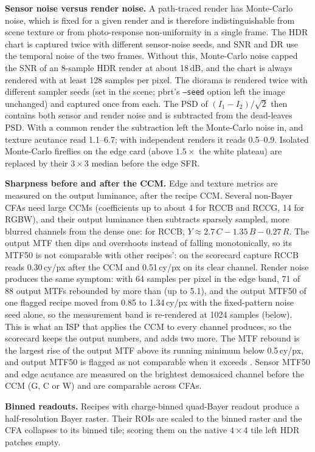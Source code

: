 \documentclass[letterpaper,twocolumn,fleqn]{article}
\begin{document}
\textbf{Sensor noise versus render noise.} A path-traced render has Monte-Carlo noise, which is fixed for a given render and is therefore indistinguishable from scene texture or from photo-response non-uniformity in a single frame. The HDR chart is captured twice with different sensor-noise seeds, and SNR and DR use the temporal noise of the two frames. Without this, Monte-Carlo noise capped the SNR of an 8-sample HDR render at about 18\,dB, and the chart is always rendered with at least 128 samples per pixel. The diorama is rendered twice with different sampler seeds (set in the scene; pbrt's \texttt{--seed} option left the image unchanged) and captured once from each. The PSD of $(I_1-I_2)/\sqrt{2}$ then contains both sensor and render noise and is subtracted from the dead-leaves PSD. With a common render the subtraction left the Monte-Carlo noise in, and texture acutance read 1.1--6.7; with independent renders it reads 0.5--0.9. Isolated Monte-Carlo fireflies on the edge card (above $1.5\times$ the white plateau) are replaced by their $3\times3$ median before the edge SFR.

\textbf{Sharpness before and after the CCM.} Edge and texture metrics are measured on the output luminance, after the recipe CCM. Several non-Bayer CFAs need large CCMs (coefficients up to about 4 for RCCB and RCCG, 14 for RGBW), and their output luminance then subtracts sparsely sampled, more blurred channels from the dense one: for RCCB, $Y\approx2.7\,C-1.35\,B-0.27\,R$. The output MTF then dips and overshoots instead of falling monotonically, so its MTF50 is not comparable with other recipes': on the scorecard capture RCCB reads 0.30\,cy/px after the CCM and 0.51\,cy/px on its clear channel. Render noise produces the same symptom: with 64 samples per pixel in the edge band, 71 of 88 output MTFs rebounded by more than \reboundLimit{} (up to 5.1), and the output MTF50 of one flagged recipe moved from 0.85 to 1.34\,cy/px with the fixed-pattern noise seed alone, so the measurement band is re-rendered at 1024 samples (below). This is what an ISP that applies the CCM to every channel produces, so the scorecard keeps the output numbers, and adds two more. The MTF rebound is the largest rise of the output MTF above its running minimum below 0.5\,cy/px, and output MTF50 is flagged as not comparable when it exceeds \reboundLimit{}. Sensor MTF50 and edge acutance are measured on the brightest demosaiced channel before the CCM (G, C or W) and are comparable across CFAs.

\textbf{Binned readouts.} Recipes with charge-binned quad-Bayer readout produce a half-resolution Bayer raster. Their ROIs are scaled to the binned raster and the CFA collapses to its binned tile; scoring them on the native $4\times4$ tile left HDR patches empty.
\end{document}
